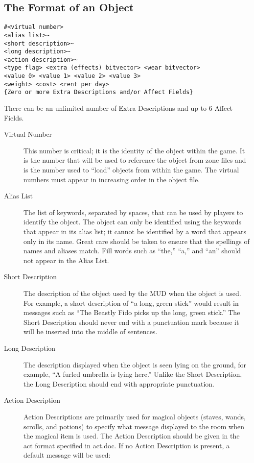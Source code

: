 \documentclass[11pt]{article}
\begin{document}
\subsection{The Format of an Object}
\begin{verbatim}
#<virtual number>
<alias list>~
<short description>~
<long description>~
<action description>~
<type flag> <extra (effects) bitvector> <wear bitvector>
<value 0> <value 1> <value 2> <value 3>
<weight> <cost> <rent per day>
{Zero or more Extra Descriptions and/or Affect Fields}
\end{verbatim}
There can be an unlimited number of Extra Descriptions and up to 6 Affect Fields.
\begin{description}
\item[Virtual Number] This number is critical; it is the identity of the object within the game.  It is the number that will be used to reference the object from zone files and is the number used to ``load'' objects from within the game.  The virtual numbers must appear in increasing order in the object file.
\item[Alias List] The list of keywords, separated by spaces, that can be used by players to identify the object.  The object can only be identified using the keywords that appear in its alias list; it cannot be identified by a word that appears only in its name.  Great care should be taken to ensure that the spellings of names and aliases match.  Fill words such as ``the,'' ``a,'' and ``an'' should not appear in the Alias List.
\item[Short Description] The description of the object used by the MUD when the object is used. 
For example, a short description of ``a long, green stick'' would result in messages such as ``The Beastly Fido picks up the long, green stick.''  The Short Description should never end with a punctuation mark because it will be inserted into the middle of sentences.
\item[Long Description] The description displayed when the object is seen lying on the ground,
for example, ``A furled umbrella is lying here.'' Unlike the Short Description, the Long Description should end with appropriate punctuation.
\item[Action Description] Action Descriptions are primarily used for magical objects (staves, wands, scrolls, and potions) to specify what message displayed to the room when the magical item is used.  The Action Description should be given in the act format specified in act.doc.  If no Action Description is present, a default message will be used:

\end{description}
\end{document}
